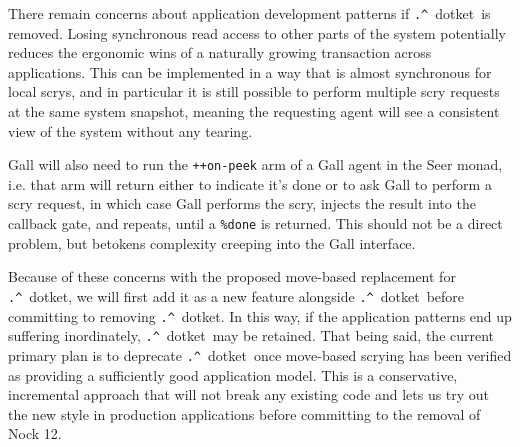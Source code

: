 \documentclass[twoside]{article}
\newcommand{\dotket}{\texttt{\string.\string^}~dotket}
\begin{document}
There remain concerns about application development patterns if \dotket~is removed.  Losing synchronous read access to other parts of the system potentially reduces the ergonomic wins of a naturally growing transaction across applications.  This can be implemented in a way that is almost synchronous for local scrys, and in particular it is still possible to perform multiple scry requests at the same system snapshot, meaning the requesting agent will see a consistent view of the system without any tearing.

Gall will also need to run the \texttt{++on-peek} arm of a Gall agent in the Seer monad, i.e. that arm will return either \texttt{} to indicate it's done or \texttt{} to ask Gall to perform a scry request, in which case Gall performs the scry, injects the result into the callback gate, and repeats, until a \texttt{\%done} is returned.  This should not be a direct problem, but betokens complexity creeping into the Gall interface.

Because of these concerns with the proposed move-based replacement for \dotket, we will first add it as a new feature alongside \dotket~before committing to removing \dotket.  In this way, if the application patterns end up suffering inordinately, \dotket~may be retained.  That being said, the current primary plan is to deprecate \dotket~once move-based scrying has been verified as providing a sufficiently good application model.  This is a conservative, incremental approach that will not break any existing code and lets us try out the new style in production applications before committing to the removal of Nock 12.



\end{document}
